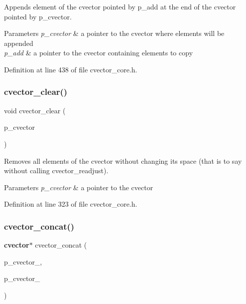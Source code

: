Appends element of the cvector pointed by p\+\_\+add at the end of the cvector pointed by p\+\_\+cvector. 
\begin{DoxyParams}{Parameters}
{\em p\+\_\+cvector} & a pointer to the cvector where elements will be appended \\
\hline
{\em p\+\_\+add} & a pointer to the cvector containing elements to copy \\
\hline
\end{DoxyParams}


Definition at line 438 of file cvector\+\_\+core.\+h.

\mbox{\label{cvector__interface_8h_aed9a4c7a1286857f5aa427938428b9f7}} 
\subsubsection{cvector\+\_\+clear()}
{\footnotesize\ttfamily void cvector\+\_\+clear (\begin{DoxyParamCaption}\item[{\textbf{ cvector} $\ast$}]{p\+\_\+cvector }\end{DoxyParamCaption})}

Removes all elements of the cvector without changing its space (that is to say without calling cvector\+\_\+readjust). 
\begin{DoxyParams}{Parameters}
{\em p\+\_\+cvector} & a pointer to the cvector \\
\hline
\end{DoxyParams}


Definition at line 323 of file cvector\+\_\+core.\+h.

\mbox{\label{cvector__interface_8h_a4a0181818d231d636c9de16a95efe931}} 
\subsubsection{cvector\+\_\+concat()}
{\footnotesize\ttfamily \textbf{ cvector}$\ast$ cvector\+\_\+concat (\begin{DoxyParamCaption}\item[{\textbf{ cvector} $\ast$}]{p\+\_\+cvector\+\_,  }\item[{\textbf{ cvector} $\ast$}]{p\+\_\+cvector\+\_ }\end{DoxyParamCaption})}

